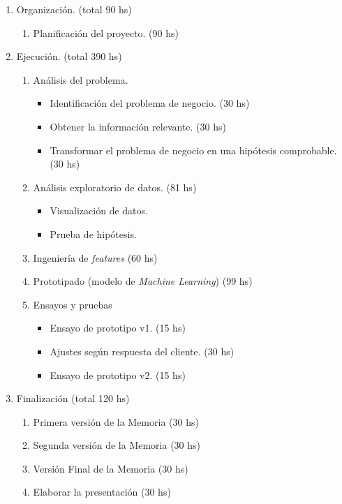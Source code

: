 \documentclass[11pt]{charter}
\begin{document}
\begin{enumerate}
  \item Organización. (total 90 hs)
    \begin{enumerate}
    \item Planificación del proyecto. (90 hs)
    \end{enumerate}
  \item Ejecución. (total 390 hs)
    \begin{enumerate}
    \item Análisis del problema. 
    \begin{itemize}
      \item Identificación del problema de negocio. (30 hs)
      \item Obtener la información relevante. (30 hs)
      \item Transformar el problema de negocio en una hipótesis comprobable. (30 hs)
    \end{itemize}
    \item Análisis exploratorio de datos. (81 hs) 
    \begin{itemize}
      \item Visualización de datos.
      \item Prueba de hipótesis.
    \end{itemize}
    \item Ingeniería de \textit{features} (60 hs)
    \item Prototipado (modelo de \textit{Machine Learning}) (99 hs)
    \item Ensayos y pruebas 
    \begin{itemize}
      \item Ensayo de prototipo v1. (15 hs)
      \item Ajustes según respuesta del cliente. (30 hs)
      \item Ensayo de prototipo v2. (15 hs)
    \end{itemize}
    \end{enumerate}
  \item Finalización (total 120 hs)
    \begin{enumerate}
      \item Primera versión de la Memoria (30 hs)
      \item Segunda versión de la Memoria (30 hs)
      \item Versión Final de la Memoria (30 hs)
      \item Elaborar la presentación (30 hs)
    \end{enumerate}
\end{enumerate}
\end{document}

